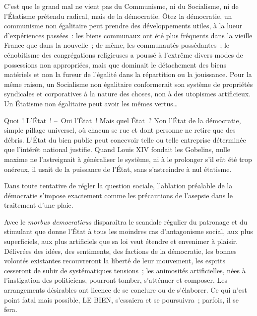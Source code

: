 \documentclass[french,twoside]{book} %
\begin{document}
C’est que le grand mal ne vient pas du Communisme, ni du Socialisme, ni de l’Étatisme prétendu radical, mais de la démocratie. Ôtez la démocratie, un communisme non égalitaire peut prendre des développements utiles, à la lueur d’expériences passées : les biens communaux ont été plus fréquents dans la vieille France que dans la nouvelle ; de même, les communautés possédantes ; le cénobitisme des congrégations religieuses a poussé à l’extrême divers modes de possessions non appropriées, mais que dominait le détachement des biens matériels et non la fureur de l’égalité dans la répartition ou la jouissance. Pour la même raison, un Socialisme non égalitaire conformerait son système de propriétés syndicales et corporatives à la nature des choses, non à des utopismes artificieux. Un Étatisme non égalitaire peut avoir les mêmes vertus…\par
Quoi ! L’État ! – Oui l’État ! Mais quel État ? Non l’État de la démocratie, simple pillage universel, où chacun se rue et dont personne ne retire que des débris. L’État du bien public peut concevoir telle ou telle entreprise déterminée que l’intérêt national justifie. Quand Louis XIV fondait les Gobelins, nulle maxime ne l’astreignait à généraliser le système, ni à le prolonger s’il eût été trop onéreux, il usait de la puissance de l’État, sans s’astreindre à nul étatisme.\par
Dans toute tentative de régler la question sociale, l’ablation préalable de la démocratie s’impose exactement comme les précautions de l’asepsie dans le traitement d’une plaie.\par
Avec le \emph{morbus democraticus} disparaîtra le scandale régulier du patronage et du stimulant que donne l’État à tous les moindres cas d’antagonisme social, aux plus superficiels, aux plus artificiels que sa loi veut étendre et envenimer à plaisir. Délivrées des idées, des sentiments, des factions de la démocratie, les bonnes volontés existantes recouvreront la liberté de leur mouvement, les esprits cesseront de subir de systématiques tensions ; les animosités artificielles, nées à l’instigation des politiciens, pourront tomber, s’atténuer et composer. Les arrangements désirables ont licence de se conclure ou de s’élaborer. Ce qui n’est point fatal mais possible, LE BIEN, s’essaiera et se poursuivra ; parfois, il se fera.\par
\end{document}
